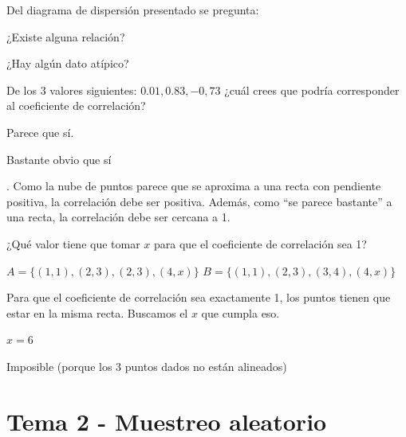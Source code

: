 \begin{problem}[8]
Del diagrama de dispersión presentado se pregunta:

\ppart ¿Existe alguna relación?

\ppart ¿Hay algún dato atípico?

\ppart De los 3 valores siguientes: $0.01, 0.83, -0,73$ ¿cuál crees que podría corresponder al coeficiente de correlación?

\solution

\spart Parece que sí.

\spart Bastante obvio que sí

. Como la nube de puntos parece que se aproxima a una recta con pendiente positiva, la correlación debe ser positiva. Además, como ``se parece bastante'' a una recta, la correlación debe ser cercana a 1.

\end{problem}

\begin{problem}[10]
¿Qué valor tiene que tomar $x$ para que el coeficiente de correlación sea 1?

\ppart $A = \{(1,1),(2,3),(2,3),(4,x)\}$
\ppart $B = \{(1,1),(2,3),(3,4),(4,x)\}$

\solution

Para que el coeficiente de correlación sea exactamente 1, los puntos tienen que estar en la misma recta. Buscamos el $x$ que cumpla eso.

\spart $x=6$

\spart Imposible (porque los 3 puntos dados no están alineados)

\end{problem}

\newpage
\section{Tema 2 - Muestreo aleatorio}

